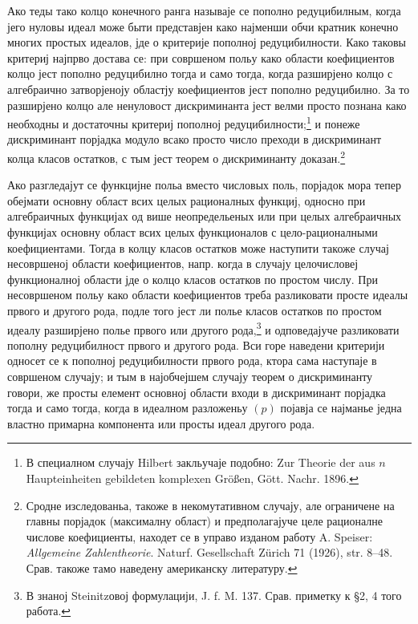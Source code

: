 \documentclass[11pt]{article}
\begin{document}
Ако теды тако колцо конечного ранга называје се пополно редуцибилным, когда јего нуловы идеал може быти представјен како најменши обчи кратник конечно многих простых идеалов, јде о критерије пополној редуцибилности. Како таковы критериј најпрво достава се: при совршеном польу како области коефициентов колцо јест пополно редуцибилно тогда и само тогда, когда разширјено колцо с алгебраично затворјеноју областју коефициентов јест пополно редуцибилно. За то разширјено колцо але ненуловост дискриминанта јест велми просто познана како необходны и достаточны критериј пополној редуцибилности;\footnote{В специалном случају Hilbert закльучаје подобно: Zur Theorie der aus $n$ Haupteinheiten gebildeten komplexen Größen, Gött. Nachr. 1896.} и понеже дискриминант порјадка модуло всако просто число преходи в дискриминант колца класов остатков, с тым јест теорем о дискриминанту доказан.\footnote{Сродне изследованьа, такоже в некомутативном случају, але ограничене на главны порјадок (максималну област) и предполагајуче целе рационалне числове коефициенты, находет се в управо изданом работу A. Speiser: \emph{Allgemeine Zahlentheorie}. Naturf. Gesellschaft Zürich 71 (1926), str. 8--48. Срав. такоже тамо наведену американску литературу.}

Ако разгледајут се функцијне польа вместо числовых поль, порјадок мора тепер обејмати основну област всих целых рационалных функциј, односно при алгебраичных функцијах од више неопредельеных или при целых алгебраичных функцијах основну област всих целых функционалов с цело-рационалными коефициентами. Тогда в колцу класов остатков може наступити такоже случај несовршеној области коефициентов, напр. когда в случају целочисловеј функционалној области јде о колцо класов остатков по простом числу. При несовршеном польу како области коефициентов треба разликовати просте идеалы првого и другого рода, подле того јест ли полье класов остатков по простом идеалу разширјено полье првого или другого рода,\footnote{В знаној Steinitzовој формулацији, J. f. M. 137. Срав. приметку к \S 2, 4 того работа.} и одповедајуче разликовати пополну редуцибилност првого и другого рода. Вси горе наведени критерији односет се к пополној редуцибилности првого рода, ктора сама наступаје в совршеном случају; и тым в најобчејшем случају теорем о дискриминанту говори, же просты елемент основној области входи в дискриминант порјадка тогда и само тогда, когда в идеалном разложеньу $(p)$ појавја се најманье једна властно примарна компонента или просты идеал другого рода.
\end{document}
